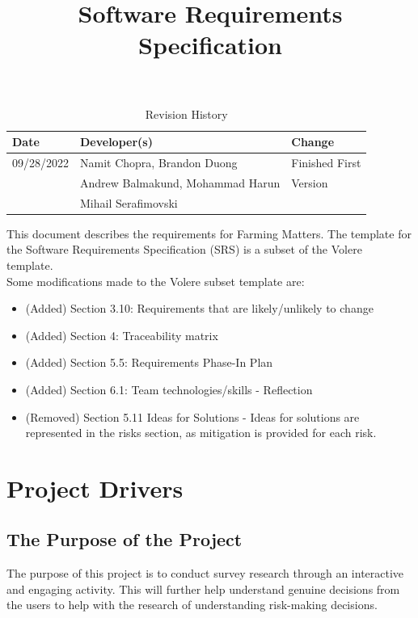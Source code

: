 \documentclass{article}
\title{Software Requirements Specification\\\progname}
\author{\authname}
\date{}
\begin{document}
\begin{table}[hp]
\caption{Revision History} \label{TblRevisionHistory}
\begin{tabularx}{\textwidth}{llX}
\toprule
\textbf{Date} & \textbf{Developer(s)} & \textbf{Change}\\
\midrule
09/28/2022 & Namit Chopra, Brandon Duong  & Finished First\\
 & Andrew Balmakund, Mohammad Harun &  Version\\
 & Mihail Serafimovski & \\
\bottomrule
\end{tabularx}
\end{table}

\newpage

\maketitle

\newpage

\tableofcontents
\listoftables
\listoffigures
\newpage


This document describes the requirements for Farming Matters. The template for the Software
Requirements Specification (SRS) is a subset of the Volere ~\citep{RobertsonAndRobertson2012} template. \newline \\ Some modifications made to the Volere subset template are:
\begin{itemize}
    \item (Added) Section 3.10: Requirements that are likely/unlikely to change
    \item (Added) Section 4: Traceability matrix
    \item (Added) Section 5.5: Requirements Phase-In Plan
    \item (Added) Section 6.1: Team technologies/skills - Reflection
    \item (Removed) Section 5.11 Ideas for Solutions - Ideas for solutions are represented in the risks section, as mitigation is provided for each risk.
\end{itemize}

\section{Project Drivers}

\subsection{The Purpose of the Project}
The purpose of this project is to conduct survey research through an interactive and engaging activity. 
This will further help understand genuine decisions from the users to help with the research of understanding risk-making decisions.
\end{document}
